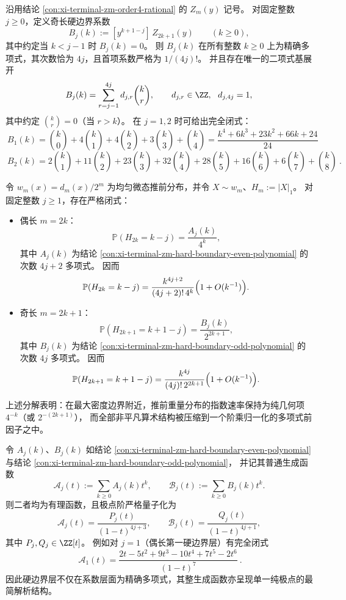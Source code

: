 \begin{conclusion}[硬边界系数的精确多项式化：奇长 \texorpdfstring{$m=2k+1$}{m=2k+1} 的层次数严格量子化为 \texorpdfstring{$4j$}{4j}]\label{con:xi-terminal-zm-hard-boundary-odd-polynomial}
沿用结论 \ref{con:xi-terminal-zm-order4-rational} 的 \(Z_m(y)\) 记号。
对固定整数 \(j\ge 0\)，定义奇长硬边界系数
\[
B_j(k):=[y^{k+1-j}]\,Z_{2k+1}(y)\qquad(k\ge 0),
\]
其中约定当 \(k<j-1\) 时 \(B_j(k)=0\)。
则 \(B_j(k)\) 在所有整数 \(k\ge 0\) 上为精确多项式，其次数恰为 \(4j\)，且首项系数严格为 \(1/(4j)!\)。
并且存在唯一的二项式基展开
\[
B_j(k)=\sum_{r=j-1}^{4j}d_{j,r}\binom{k}{r},\qquad d_{j,r}\in\ZZ,\ \ d_{j,4j}=1,
\]
其中约定 \(\binom{k}{r}=0\)（当 \(r>k\)）。
在 \(j=1,2\) 时可给出完全闭式：
\[
\boxed{\ B_1(k)=\binom{k}{0}+4\binom{k}{1}+4\binom{k}{2}+3\binom{k}{3}+\binom{k}{4}
=\frac{k^4+6k^3+23k^2+66k+24}{24}\ }
\]
\[
\boxed{\ B_2(k)=2\binom{k}{1}+11\binom{k}{2}+23\binom{k}{3}+32\binom{k}{4}+28\binom{k}{5}+16\binom{k}{6}+6\binom{k}{7}+\binom{k}{8}\ }.
\]
\end{conclusion}

\begin{conclusion}\label{con:xi-terminal-zm-hard-boundary-ldp-prefactor}
令 \(w_m(x)=d_m(x)/2^m\) 为均匀微态推前分布，并令 \(X\sim w_m\)、\(H_m:=|X|_1\)。
对固定整数 \(j\ge 1\)，存在严格闭式：
\begin{itemize}
  \item 偶长 \(m=2k\)：
  \[
  \mathbb{P}(H_{2k}=k-j)=\frac{A_j(k)}{4^k},
  \]
  其中 \(A_j(k)\) 为结论 \ref{con:xi-terminal-zm-hard-boundary-even-polynomial} 的次数 \(4j+2\) 多项式。
  因而
  \[
  \mathbb{P}(H_{2k}=k-j)=\frac{k^{4j+2}}{(4j+2)!\,4^k}\Bigl(1+O(k^{-1})\Bigr).
  \]
  \item 奇长 \(m=2k+1\)：
  \[
  \mathbb{P}(H_{2k+1}=k+1-j)=\frac{B_j(k)}{2^{2k+1}},
  \]
  其中 \(B_j(k)\) 为结论 \ref{con:xi-terminal-zm-hard-boundary-odd-polynomial} 的次数 \(4j\) 多项式。
  因而
  \[
  \mathbb{P}(H_{2k+1}=k+1-j)=\frac{k^{4j}}{(4j)!\,2^{2k+1}}\Bigl(1+O(k^{-1})\Bigr).
  \]
\end{itemize}
上述分解表明：在最大密度边界附近，推前重量分布的指数速率保持为纯几何项 \(4^{-k}\)（或 \(2^{-(2k+1)}\)），
而全部非平凡算术结构被压缩到一个阶乘归一化的多项式前因子之中。
\end{conclusion}

\begin{conclusion}\label{con:xi-terminal-zm-hard-boundary-pure-pole}
令 \(A_j(k)\)、\(B_j(k)\) 如结论 \ref{con:xi-terminal-zm-hard-boundary-even-polynomial} 与结论 \ref{con:xi-terminal-zm-hard-boundary-odd-polynomial}，
并记其普通生成函数
\[
\mathcal A_j(t):=\sum_{k\ge 0}A_j(k)t^k,\qquad \mathcal B_j(t):=\sum_{k\ge 0}B_j(k)t^k.
\]
则二者均为有理函数，且极点阶严格量子化为
\[
\mathcal A_j(t)=\frac{P_j(t)}{(1-t)^{4j+3}},\qquad
\mathcal B_j(t)=\frac{Q_j(t)}{(1-t)^{4j+1}},
\]
其中 \(P_j,Q_j\in\ZZ[t]\)。
例如对 \(j=1\)（偶长第一硬边界层）有完全闭式
\[
\boxed{\ \mathcal A_1(t)=\frac{2t-5t^2+9t^3-10t^4+7t^5-2t^6}{(1-t)^7}\ }.
\]
因此硬边界层不仅在系数层面为精确多项式，其整生成函数亦呈现单一纯极点的最简解析结构。
\end{conclusion}

